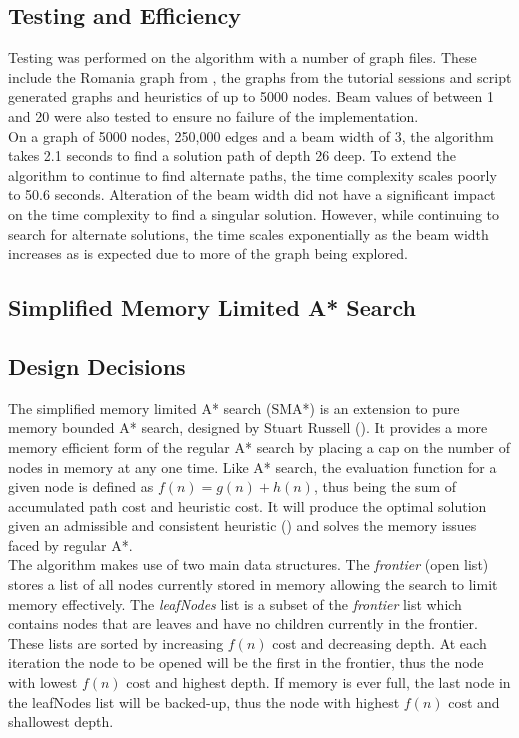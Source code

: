 \documentclass[]{article}
\begin{document}
\subsection*{Testing and Efficiency}

Testing was performed on the algorithm with a number of graph files. These include the Romania graph from \cite{norvig}, the graphs from the tutorial sessions and script generated graphs and heuristics of up to 5000 nodes. Beam values of between 1 and 20 were also tested to ensure no failure of the implementation.\\

On a graph of 5000 nodes, 250,000 edges and a beam width of 3, the algorithm takes 2.1 seconds to find a solution path of depth 26 deep. To extend the algorithm to continue to find alternate paths, the time complexity scales poorly to 50.6 seconds. Alteration of the beam width did not have a significant impact on the time complexity to find a singular solution. However, while continuing to search for alternate solutions, the time scales exponentially as the beam width increases as is expected due to more of the graph being explored.

\pagebreak

\begin{center}
	\section*{Simplified Memory Limited A* Search}
\end{center}

\vspace*{0.8cm}
\subsection*{Design Decisions}

The simplified memory limited A* search (SMA*) is an extension to pure memory bounded A* search, designed by Stuart Russell (\cite{russell_paper}). It provides a more memory efficient form of the regular A* search by placing a cap on the number of nodes in memory at any one time. Like A* search, the evaluation function for a given node is defined as $f(n)=g(n)+h(n)$, thus being the sum of accumulated path cost and heuristic cost. It will produce the optimal solution given an admissible and consistent heuristic (\cite{norvig}) and solves the memory issues faced by regular A*. \\

The algorithm makes use of two main data structures. The \textit{frontier} (open list) stores a list of all nodes currently stored in memory allowing the search to limit memory effectively. The \textit{leafNodes} list is a subset of the \textit{frontier} list which contains nodes that are leaves and have no children currently in the frontier. These lists are sorted by increasing $f(n)$ cost and decreasing depth. At each iteration the node to be opened will be the first in the frontier, thus the node with lowest $f(n)$ cost and highest depth. If memory is ever full, the last node in the leafNodes list will be backed-up, thus the node with highest $f(n)$ cost and shallowest depth.\\
\end{document}
